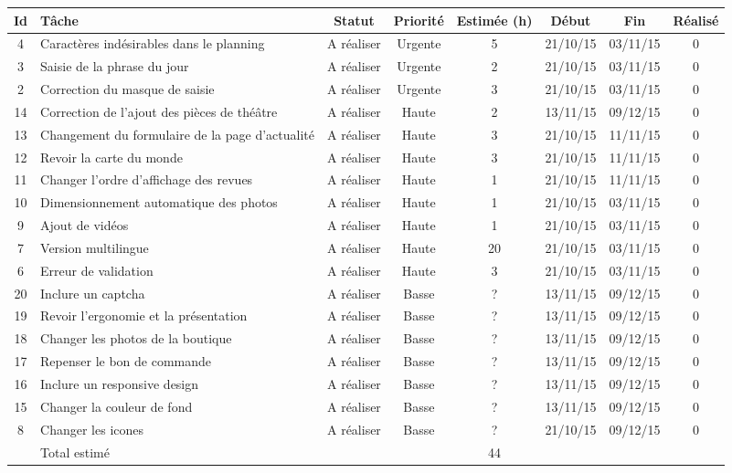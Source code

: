 
\begin{tabular}{ | c | p{4cm} | c | c | c | c | c | c |   }
\hline 
Id & Tâche & Statut & Priorité & Estimée (h) & Début & Fin & Réalisé \\ \hline

4 & Caractères indésirables dans le planning & A réaliser & Urgente & 5 & 21/10/15
	& 03/11/15 & 0  \\ \hline
3 & Saisie de la phrase du jour & A réaliser & Urgente & 2 & 21/10/15 & 03/11/15
	& 0  \\ \hline
2 & Correction du masque de saisie & A réaliser & Urgente & 3 & 21/10/15 &
	03/11/15 & 0  \\ \hline
	
14 & Correction de l'ajout des pièces de théâtre & A réaliser & Haute & 2 &
	13/11/15 & 09/12/15 & 0 \\ \hline
13 & Changement du formulaire de la page d'actualité & A réaliser & Haute & 3 &
	21/10/15 & 11/11/15 & 0  \\ \hline
12 & Revoir la carte du monde & A réaliser & Haute & 3 & 21/10/15 & 11/11/15 & 0
	 \\ \hline
11 & Changer l'ordre d'affichage des revues & A réaliser & Haute & 1 & 21/10/15
	& 11/11/15 & 0  \\ \hline
10 & Dimensionnement automatique des photos & A réaliser & Haute & 1 & 21/10/15
	& 03/11/15 & 0  \\ \hline
9 & Ajout de vidéos & A réaliser & Haute & 1 & 21/10/15 & 03/11/15 & 0  \\
\hline
7 & Version multilingue & A réaliser & Haute & 20 & 21/10/15 & 03/11/15 & 0  \\
\hline
6 & Erreur de validation & A réaliser & Haute & 3 & 21/10/15 & 03/11/15 & 0  \\
\hline



	
20 & Inclure un captcha & A réaliser & Basse & ? & 13/11/15 &
	09/12/15 & 0  \\ \hline
19 & Revoir l'ergonomie et la présentation & A réaliser & Basse & ? & 13/11/15
	& 09/12/15 & 0  \\ \hline
18 & Changer les photos de la boutique & A réaliser & Basse & ? & 13/11/15 &
	09/12/15 & 0  \\ \hline
17 & Repenser le bon de commande & A réaliser & Basse & ? & 13/11/15 & 09/12/15
	& 0  \\ \hline
16 & Inclure un responsive design & A réaliser & Basse & ? &
	13/11/15 & 09/12/15 & 0  \\ \hline
15 & Changer la couleur de fond & A réaliser & Basse & ? & 13/11/15 & 09/12/15
	& 0   \\ \hline
8 & Changer les icones & A réaliser & Basse & ? & 21/10/15 & 09/12/15 & 0  \\
\hline

	
 & Total estimé &  &  & 44 &  &  & \\ \hline
 \end{tabular}
